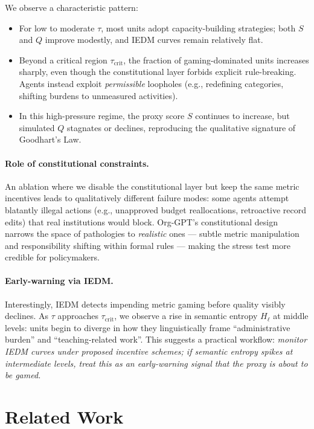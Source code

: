 \documentclass{article}
\begin{document}
We observe a characteristic pattern:

\begin{itemize}
    \item For low to moderate $\tau$, most units adopt capacity-building strategies; both $S$ and $Q$ improve modestly, and IEDM curves remain relatively flat.
    \item Beyond a critical region $\tau_{\mathrm{crit}}$, the fraction of gaming-dominated units increases sharply, even though the constitutional layer forbids explicit rule-breaking. Agents instead exploit \emph{permissible} loopholes (e.g., redefining categories, shifting burdens to unmeasured activities).
    \item In this high-pressure regime, the proxy score $S$ continues to increase, but simulated $Q$ stagnates or declines, reproducing the qualitative signature of Goodhart's Law.
\end{itemize}

\paragraph{Role of constitutional constraints.}
An ablation where we disable the constitutional layer but keep the same metric incentives leads to qualitatively different failure modes: some agents attempt blatantly illegal actions (e.g., unapproved budget reallocations, retroactive record edits) that real institutions would block. Org-GPT's constitutional design narrows the space of pathologies to \emph{realistic} ones --- subtle metric manipulation and responsibility shifting within formal rules --- making the stress test more credible for policymakers.

\paragraph{Early-warning via IEDM.}
Interestingly, IEDM detects impending metric gaming before quality visibly declines. As $\tau$ approaches $\tau_{\mathrm{crit}}$, we observe a rise in semantic entropy $H_\ell$ at middle levels: units begin to diverge in how they linguistically frame ``administrative burden'' and ``teaching-related work''. This suggests a practical workflow: \emph{monitor IEDM curves under proposed incentive schemes; if semantic entropy spikes at intermediate levels, treat this as an early-warning signal that the proxy is about to be gamed.}

\section{Related Work}
\end{document}
